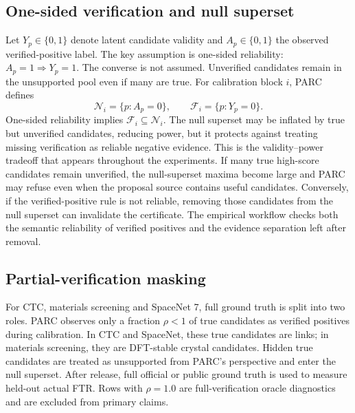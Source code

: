 \documentclass[10pt,twocolumn]{article}
\newcommand{\Ncal}{\mathcal N}
\newcommand{\Fcal}{\mathcal F}
\begin{document}
\subsection{One-sided verification and null superset}

Let \(Y_p\in\{0,1\}\) denote latent candidate validity and \(A_p\in\{0,1\}\) the observed verified-positive label.
The key assumption is one-sided reliability: \(A_p=1\Rightarrow Y_p=1\).
The converse is not assumed.
Unverified candidates remain in the unsupported pool even if many are true.
For calibration block \(i\), PARC defines
\[
  \Ncal_i=\{p:A_p=0\},\qquad \Fcal_i=\{p:Y_p=0\}.
\]
One-sided reliability implies \(\Fcal_i\subseteq\Ncal_i\).
The null superset may be inflated by true but unverified candidates, reducing power, but it protects against treating missing verification as reliable negative evidence.
This is the validity--power tradeoff that appears throughout the experiments.
If many true high-score candidates remain unverified, the null-superset maxima become large and PARC may refuse even when the proposal source contains useful candidates.
Conversely, if the verified-positive rule is not reliable, removing those candidates from the null superset can invalidate the certificate.
The empirical workflow checks both the semantic reliability of verified positives and the evidence separation left after removal.

\subsection{Partial-verification masking}

For CTC, materials screening and SpaceNet 7, full ground truth is split into two roles.
PARC observes only a fraction \(\rho<1\) of true candidates as verified positives during calibration.
In CTC and SpaceNet, these true candidates are links; in materials screening, they are DFT-stable crystal candidates.
Hidden true candidates are treated as unsupported from PARC's perspective and enter the null superset.
After release, full official or public ground truth is used to measure held-out actual FTR.
Rows with \(\rho=1.0\) are full-verification oracle diagnostics and are excluded from primary claims.
\end{document}
